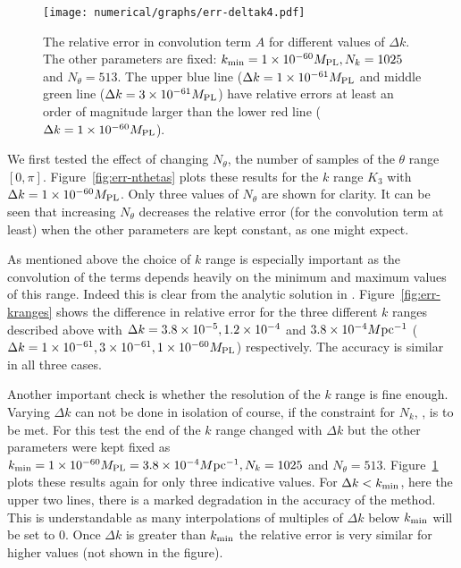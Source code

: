 \begin{figure}
 \centering
 \texttt{[image: numerical/graphs/err-deltak4.pdf]}
 \caption[Relative error in the convolution term $A$]{The relative error in
convolution term $A$ for different values of $\Delta k$.
The other parameters are fixed: $k_{\mathrm{min}}=1\times10^{-60}M_{\mathrm{PL}}, N_k = 1025$ and $N_\theta=513$. The
upper 
blue line ($\Delta k=1\times 10^{-61}M_{\mathrm{PL}}$ and middle green line ($\Delta k=3\times 10^{-61}M_{\mathrm{PL}}$) have relative
errors at
least an order of magnitude larger than the lower red line ($\Delta k=1\times 10^{-60}M_{\mathrm{PL}}$).}
 \label{fig:err-deltaks}
\end{figure}


We first tested the effect of changing $N_\theta$, the number of
samples of the $\theta$ range $[0,\pi]$.  Figure~\ref{fig:err-nthetas}
plots these results for the $k$ range $K_3$ with $\Delta k =
1\times 10^{-60}M_{\mathrm{PL}}$. Only three values of $N_\theta$ are shown for clarity. It
can be seen that increasing $N_\theta$ decreases the relative error (for the convolution
term at least) when the other parameters are kept constant, as one
might expect.


As mentioned above the choice of $k$ range is especially important as
the convolution of the terms depends heavily on the minimum and
maximum values of this range. Indeed this is clear from the analytic
solution in . Figure~\ref{fig:err-kranges}
shows the difference in relative error for the three different $k$
ranges described above with 
$\Delta k= 3.8\times 10^{-5}, 1.2\times 10^{-4}$ and $3.8\times 10^{-4}M \mathrm{pc}^{-1}$
($\Delta k= 1\times 10^{-61}, 3\times 10^{-61},1\times 10^{-60}M_{\mathrm{PL}}$)
respectively. The accuracy is similar in all three cases.


Another important check is whether the resolution of the $k$ range is
fine enough. Varying $\Delta k$ can not be done in isolation of
course, if the constraint for $N_k$, ,
is to
be met. For this test the end of the $k$ range changed with $\Delta k$
but the other parameters were kept fixed as $k_{\mathrm{min}}=1\times 10^{-60}M_{\mathrm{PL}}=3.8\times 10^{-4}M \mathrm{pc}^{-1},
N_k = 1025$ and $N_\theta=513$. Figure~\ref{fig:err-deltaks} plots
these results again for only three indicative values.  For $\Delta
k<k_{\mathrm{min}}$, here the upper two lines, there is a marked degradation in
the accuracy of the method. This is understandable as many
interpolations of multiples of $\Delta k$ below $k_{\mathrm{min}}$ will be set to
$0$. Once $\Delta k$ is greater than $k_{\mathrm{min}}$ the relative error is
very similar for higher values (not shown in the figure).


